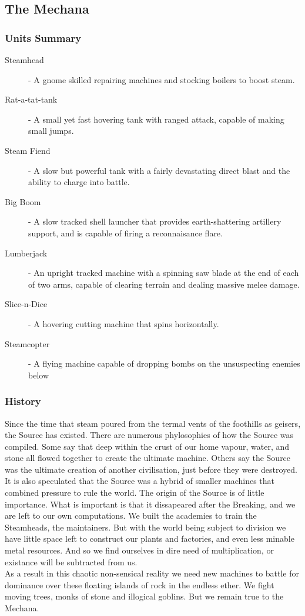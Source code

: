 \documentclass[a4paper,twocolumn]{article}
\begin{document}
\subsection{The Mechana}

\subsubsection{Units Summary}

\begin{description}
\item[Steamhead] - A gnome skilled repairing machines and stocking boilers to boost steam.

\item[Rat-a-tat-tank] - A small yet fast hovering tank with ranged attack, capable of making small jumps.
\item[Steam Fiend] - A slow but powerful tank with a fairly devastating direct blast and the ability to charge into battle.
\item[Big Boom] - A slow tracked shell launcher that provides earth-shattering artillery support, and is capable of firing a reconnaisance flare.
\item[Lumberjack] - An upright tracked machine with a spinning saw blade at the end of each of two arms, capable of clearing terrain and dealing massive melee damage.
\item[Slice-n-Dice] - A hovering cutting machine that spins horizontally.
\item[Steamcopter] - A flying machine capable of dropping bombs on the unsuspecting enemies below
\end{description}

\subsubsection{History}

Since the time that steam poured from the termal vents of the foothills as geisers, the Source has existed. There are numerous phylosophies of how the Source was compiled. Some say that deep within the crust of our home vapour, water, and stone all flowed together to create the ultimate machine. Others say the Source was the ultimate creation of another civilisation, just before they were destroyed. It is also speculated that the Source was a hybrid of smaller machines that combined pressure to rule the world. The origin of the Source is of little importance. What is important is that it dissapeared after the Breaking, and we are left to our own computations. We built the academies to train the Steamheads, the maintainers. But with the world being subject to division we have little space left to construct our plants and factories, and even less minable metal resources. And so we find ourselves in dire need of multiplication, or existance will be subtracted from us. \\
As a result in this chaotic non-sensical reality we need new machines to battle for dominance over these floating islands of rock in the endless ether. We fight moving trees, monks of stone and illogical goblins. But we remain true to the Mechana.
\end{document}
